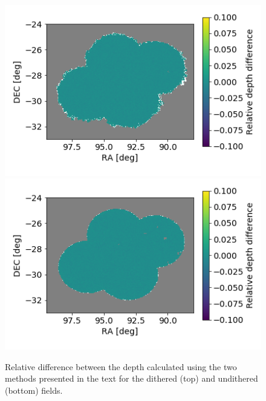 \documentclass[\docopts]{\docclass}
\begin{document}
\begin{figure}
\centering
\includegraphics[width=0.9\columnwidth]{dithered_difference.png}
\includegraphics[width=0.9\columnwidth]{undithered_difference.png}
\caption{Relative difference between the depth calculated using the two methods presented in the text for the dithered (top) and undithered (bottom) fields.}
\label{fig:depth_comparison}
\end{figure}
\end{document}
